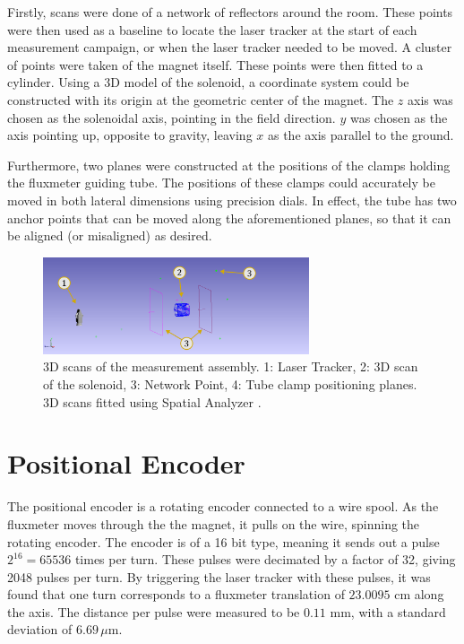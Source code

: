 Firstly, scans were done of a network of reflectors around the
room. These points were then used as a baseline to locate the
laser tracker at the start of each measurement campaign, or when
the laser tracker needed to be moved. A cluster of points were
taken of the magnet itself. These points
were then fitted to a cylinder. Using a 3D model of the
solenoid, a coordinate system could be constructed
with its origin at the geometric center of the magnet.
The $z$ axis was chosen as the solenoidal axis, pointing
in the field direction. $y$ was chosen as the axis
pointing up, opposite to gravity, leaving $x$ as 
the axis parallel to the ground.

Furthermore, two planes were constructed at the positions
of the clamps holding the fluxmeter guiding tube. The
positions of these clamps could accurately be moved in
both lateral dimensions using precision dials. In effect,
the tube has two anchor points that can be moved along
the aforementioned planes, so that it can be aligned (or misaligned)
as desired.

\begin{figure}[!h]
    \centering
    \includegraphics[width=0.7\textwidth]{figs/3Dscan}
    \caption{3D scans of the measurement assembly.
        1: Laser Tracker, 2: 3D scan of the solenoid,
        3: Network Point, 4: Tube clamp positioning planes.
        3D scans fitted using Spatial Analyzer \cite{hexagon_spatial_nodate}.}
    \label{fig:3dscan}
\end{figure}

\section{Positional Encoder}
The positional encoder is a rotating encoder connected to a wire spool.
As the fluxmeter moves through the the magnet, it pulls on the wire,
spinning the rotating encoder. The encoder is of a 16 bit type, meaning
it sends out a pulse $2^{16} = 65536$ times per turn. These pulses were
decimated by a factor of 32, giving 2048 pulses per turn. By triggering
the laser tracker with these pulses, it was found that one turn corresponds
to a fluxmeter translation of $23.0095$ cm along the axis. The distance
per pulse were measured to be $0.11$ mm, with a standard deviation of
$6.69 \, \mu \text{m}$.

